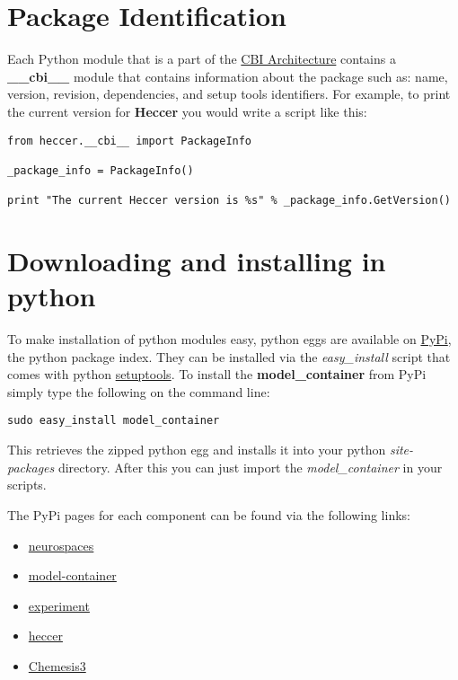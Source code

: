 \documentclass[12pt]{article}
\begin{document}
\section*{Package Identification}

	Each Python module that is a part of the \href{../cbi-architecture/cbi-architecture.tex}{CBI Architecture} contains a {\bf \_\_cbi\_\_} module that contains information about the package such as: name, version, revision, dependencies, and setup tools identifiers. For example, to print the current version for {\bf Heccer} you would write a script like this:
	
\begin{verbatim}
from heccer.__cbi__ import PackageInfo

_package_info = PackageInfo()

print "The current Heccer version is %s" % _package_info.GetVersion()

\end{verbatim}

\section*{Downloading and installing in python}

	To make installation of python modules easy, python eggs are available on \href{http://pypi.python.org/}{PyPi}, the python package index.  They can be installed via the {\it easy\_install} script that comes with python \href{http://pypi.python.org/pypi?:action=display&name=setuptools}{setuptools}. To install the {\bf model\_container} from PyPi simply type the following on the command line:
	
\begin{verbatim}
sudo easy_install model_container 
\end{verbatim}

This retrieves the zipped python egg and installs it into your python {\it site-packages} directory. After this you can just import the {\it model\_container} in your scripts. 

The PyPi pages for each component can be found via the following links:

\begin{itemize}
\item[] \href{http://pypi.python.org/pypi/neurospaces}{neurospaces}
\item[] \href{http://pypi.python.org/pypi/model-container}{model-container}
\item[] \href{http://pypi.python.org/pypi/experiment}{experiment}
\item[] \href{http://pypi.python.org/pypi/heccer}{heccer}
\item[] \href{http://pypi.python.org/pypi/chemesis3}{Chemesis3}
\end{itemize}
\end{document}
